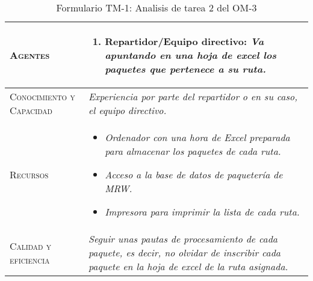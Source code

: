 \begin{table}[H]
{\begin{tabularx}{\textwidth}{|l|X|}
			\hline
			\textsc{Agentes} & 
				\begin{enumerate}
					\item \textbf{Repartidor/Equipo directivo:} \textit{Va apuntando en una hoja de excel los paquetes que pertenece a su ruta.}
				\end{enumerate} \\
			\hline
			\textsc{Conocimiento y Capacidad} & \textit{Experiencia por parte del repartidor o en su caso, el equipo directivo.} \\
			\hline
			\textsc{Recursos} & 
				\begin{itemize}
					\item \textit{Ordenador con una hora de Excel preparada para almacenar los paquetes de cada ruta.}
					\item \textit{Acceso a la base de datos de paquetería de MRW.}
					\item \textit{Impresora para imprimir la lista de cada ruta.}
				\end{itemize} \\
			\hline
			\textsc{Calidad y eficiencia} & \textit{Seguir unas pautas de procesamiento de cada paquete, es decir, no olvidar de inscribir cada paquete en la hoja de excel de la ruta asignada.} \\
			\hline
		\end{tabularx}
	}
	\caption{\label{tab:TM1T2}Formulario TM-1: Analisis de tarea 2 del OM-3}
\end{table} 

